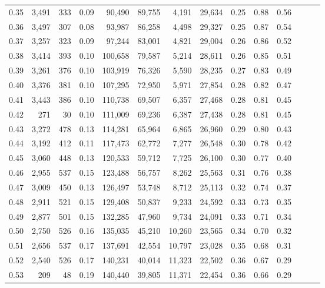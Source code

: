 \begin{tabular}{rrrrrrrrrrrrrr}
0.35 &  3,491 &  333 &  0.09 &   90,490 &   89,755 &   4,191 &  29,634 &  0.25 &  0.88 &      0.56 \\
0.36 &  3,497 &  307 &  0.08 &   93,987 &   86,258 &   4,498 &  29,327 &  0.25 &  0.87 &      0.54 \\
0.37 &  3,257 &  323 &  0.09 &   97,244 &   83,001 &   4,821 &  29,004 &  0.26 &  0.86 &      0.52 \\
0.38 &  3,414 &  393 &  0.10 &  100,658 &   79,587 &   5,214 &  28,611 &  0.26 &  0.85 &      0.51 \\
0.39 &  3,261 &  376 &  0.10 &  103,919 &   76,326 &   5,590 &  28,235 &  0.27 &  0.83 &      0.49 \\
0.40 &  3,376 &  381 &  0.10 &  107,295 &   72,950 &   5,971 &  27,854 &  0.28 &  0.82 &      0.47 \\
0.41 &  3,443 &  386 &  0.10 &  110,738 &   69,507 &   6,357 &  27,468 &  0.28 &  0.81 &      0.45 \\
0.42 &    271 &   30 &  0.10 &  111,009 &   69,236 &   6,387 &  27,438 &  0.28 &  0.81 &      0.45 \\
0.43 &  3,272 &  478 &  0.13 &  114,281 &   65,964 &   6,865 &  26,960 &  0.29 &  0.80 &      0.43 \\
0.44 &  3,192 &  412 &  0.11 &  117,473 &   62,772 &   7,277 &  26,548 &  0.30 &  0.78 &      0.42 \\
0.45 &  3,060 &  448 &  0.13 &  120,533 &   59,712 &   7,725 &  26,100 &  0.30 &  0.77 &      0.40 \\
0.46 &  2,955 &  537 &  0.15 &  123,488 &   56,757 &   8,262 &  25,563 &  0.31 &  0.76 &      0.38 \\
0.47 &  3,009 &  450 &  0.13 &  126,497 &   53,748 &   8,712 &  25,113 &  0.32 &  0.74 &      0.37 \\
0.48 &  2,911 &  521 &  0.15 &  129,408 &   50,837 &   9,233 &  24,592 &  0.33 &  0.73 &      0.35 \\
0.49 &  2,877 &  501 &  0.15 &  132,285 &   47,960 &   9,734 &  24,091 &  0.33 &  0.71 &      0.34 \\
0.50 &  2,750 &  526 &  0.16 &  135,035 &   45,210 &  10,260 &  23,565 &  0.34 &  0.70 &      0.32 \\
0.51 &  2,656 &  537 &  0.17 &  137,691 &   42,554 &  10,797 &  23,028 &  0.35 &  0.68 &      0.31 \\
0.52 &  2,540 &  526 &  0.17 &  140,231 &   40,014 &  11,323 &  22,502 &  0.36 &  0.67 &      0.29 \\
0.53 &    209 &   48 &  0.19 &  140,440 &   39,805 &  11,371 &  22,454 &  0.36 &  0.66 &      0.29 \\

\end{tabular}
